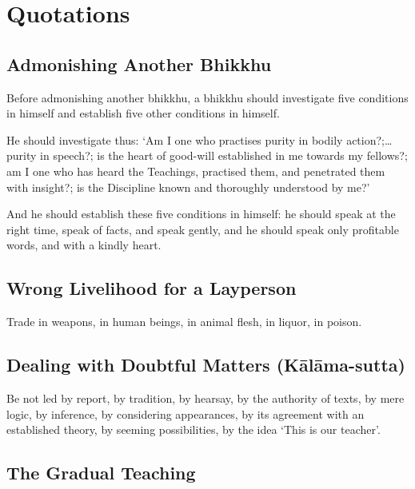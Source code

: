 \chapter{Quotations}

\section*{Admonishing Another Bhikkhu}

Before admonishing another bhikkhu, a bhikkhu should investigate five conditions
in himself and establish five other conditions in himself.

He should investigate thus: ‘Am I one who practises purity in bodily action?;…
purity in speech?; is the heart of good-will established in me towards my
fellows?; am I one who has heard the Teachings, practised them, and penetrated
them with insight?; is the Discipline known and thoroughly understood by me?’

And he should establish these five conditions in himself: he should speak at the
right time, speak of facts, and speak gently, and he should speak only
profitable words, and with a kindly heart.


\section*{Wrong Livelihood for a Layperson}

Trade in weapons, in human beings, in animal flesh, in liquor, in poison.


\ifhandbookedition
\vspace*{-\baselineskip}
\fi

\section*{Dealing with Doubtful Matters (Kālāma-sutta)}

Be not led by report, by tradition, by hearsay, by the authority of texts, by
mere logic, by inference, by considering appearances, by its agreement with an
established theory, by seeming possibilities, by the idea ‘This is our teacher’.


\ifhandbookedition
\vspace*{-\baselineskip}
\fi

\section*{The Gradual Teaching}

